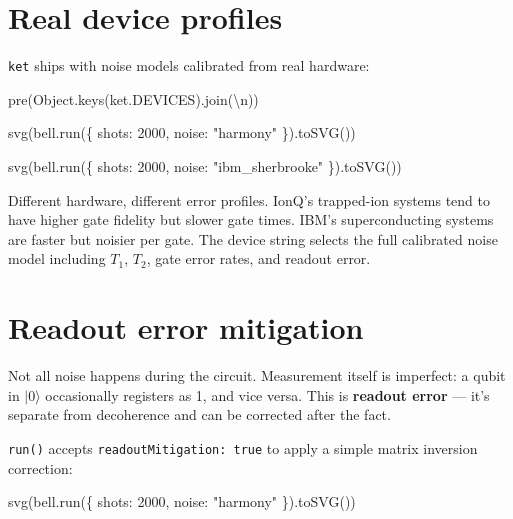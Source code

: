 \documentclass[
  11pt,
  letterpaper,
  oneside]{scrbook}
\newenvironment{Shaded}{\begin{snugshade}}{\end{snugshade}}
\newcommand{\NormalTok}[1]{\textcolor[rgb]{0.00,0.23,0.31}{#1}}
\begin{document}
\section{Real device profiles}\label{real-device-profiles}

\texttt{ket} ships with noise models calibrated from real hardware:

\begin{Shaded}
\begin{Highlighting}[]
\NormalTok{pre(Object.keys(ket.DEVICES).join(\textquotesingle{}\textbackslash{}n\textquotesingle{}))}
\end{Highlighting}
\end{Shaded}

\begin{Shaded}
\begin{Highlighting}[]
\NormalTok{svg(bell.run(\{ shots: 2000, noise: "harmony" \}).toSVG())}
\end{Highlighting}
\end{Shaded}

\begin{Shaded}
\begin{Highlighting}[]
\NormalTok{svg(bell.run(\{ shots: 2000, noise: "ibm\_sherbrooke" \}).toSVG())}
\end{Highlighting}
\end{Shaded}

Different hardware, different error profiles. IonQ's trapped-ion systems
tend to have higher gate fidelity but slower gate times. IBM's
superconducting systems are faster but noisier per gate. The device
string selects the full calibrated noise model including \(T_1\),
\(T_2\), gate error rates, and readout error.

\section{Readout error mitigation}\label{readout-error-mitigation}

Not all noise happens during the circuit. Measurement itself is
imperfect: a qubit in \(|0\rangle\) occasionally registers as 1, and
vice versa. This is \textbf{readout error} --- it's separate from
decoherence and can be corrected after the fact.

\texttt{run()} accepts \texttt{readoutMitigation:\ true} to apply a
simple matrix inversion correction:

\begin{Shaded}
\begin{Highlighting}[]
\NormalTok{svg(bell.run(\{ shots: 2000, noise: "harmony" \}).toSVG())}
\end{Highlighting}
\end{Shaded}
\end{document}
